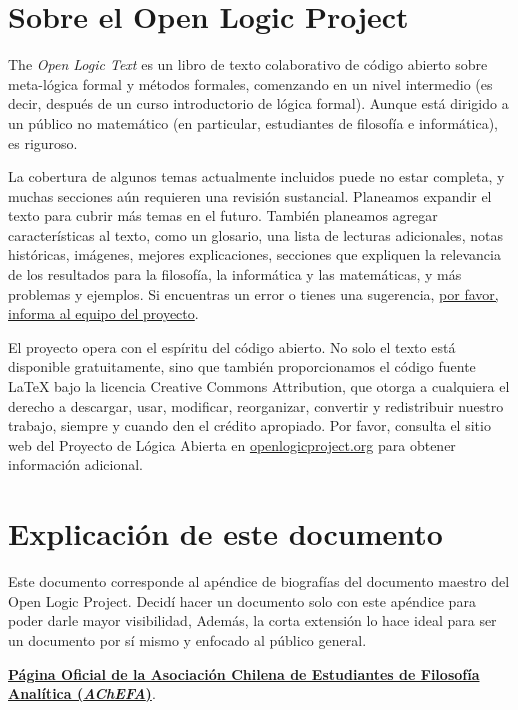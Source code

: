 \chapter*{Sobre el Open Logic Project}


The \textit{Open Logic Text} es un libro de texto colaborativo de código abierto sobre meta-lógica formal y métodos formales, comenzando en un nivel intermedio (es decir, después de un curso introductorio de lógica formal). Aunque está dirigido a un público no matemático (en particular, estudiantes de filosofía e informática), es riguroso.

La cobertura de algunos temas actualmente incluidos puede no estar completa, y muchas secciones aún requieren una revisión sustancial. Planeamos expandir el texto para cubrir más temas en el futuro. También planeamos agregar características al texto, como un glosario, una lista de lecturas adicionales, notas históricas, imágenes, mejores explicaciones, secciones que expliquen la relevancia de los resultados para la filosofía, la informática y las matemáticas, y más problemas y ejemplos. Si encuentras un error o tienes una sugerencia, \href{https://github.com/OpenLogicProject/OpenLogic/wiki/Contributing}{por favor, informa al equipo del proyecto}.

El proyecto opera con el espíritu del código abierto. No solo el texto está disponible gratuitamente, sino que también proporcionamos el código fuente LaTeX bajo la licencia Creative Commons Attribution, que otorga a cualquiera el derecho a descargar, usar, modificar, reorganizar, convertir y redistribuir nuestro trabajo, siempre y cuando den el crédito apropiado. Por favor, consulta el sitio web del Proyecto de Lógica Abierta en \href{http://openlogicproject.org/}{openlogicproject.org} para obtener información adicional.

\chapter*{Explicación de este documento}
Este documento corresponde al apéndice de biografías del documento maestro del Open Logic Project. Decidí hacer un documento solo con este apéndice para poder darle mayor visibilidad, Además, la corta extensión lo hace ideal para ser un documento por sí mismo y enfocado al público general.
\vspace{1cm}

\noindent \href{https://sites.google.com/view/achefa/inicio}{\textbf{Página Oficial de la Asociación Chilena de Estudiantes de Filosofía Analítica (\textit{AChEFA})}}.

